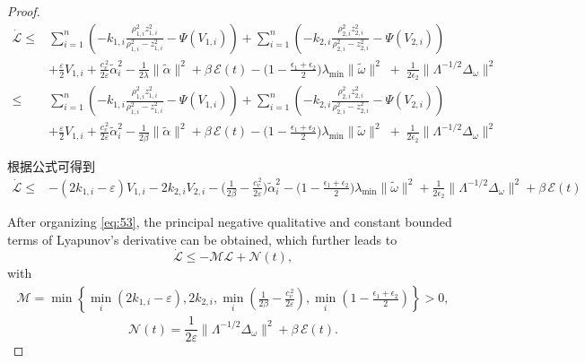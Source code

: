 \documentclass[pdflatex,sn-mathphys-num]{sn-jnl}%
\theoremstyle{thmstyleone}%
\theoremstyle{thmstyletwo}%
\theoremstyle{thmstylethree}%
\begin{document}
\begin{proof}
\begin{equation}\label{eq:45}
	\begin{aligned}
		\dot{\mathcal{L}} 
		\le&\sum_{i=1}^n \left( - k_{1,i}\frac{\rho_{1,i}^2 z_{1,i}^2}{\rho_{1,i}^2-z_{1,i}^2}-\Psi(V_{1,i})\right)
		+\sum_{i=1}^n \left( - k_{2,i}\frac{\rho_{2,i}^2 z_{2,i}^2}{\rho_{2,i}^2-z_{2,i}^2}-\Psi(V_{2,i})  \right)\\
		&+\frac{\varepsilon}{2} V_{1,i}+\frac{c_v^{\,2}}{2\varepsilon}\tilde\alpha_i^2-\frac{1}{2\lambda}\|\tilde\alpha\|^2+\beta\,\mathcal{E}(t)-\Big(1-\tfrac{\epsilon_1+\epsilon_2}{2}\Big)\lambda_{\min}\|\tilde\omega\|^2\;+\;\tfrac{1}{2\epsilon_2}\big\|\Lambda^{-1/2}\Delta_\omega\big\|^2\\
\le&\sum_{i=1}^n \left( - k_{1,i}\frac{\rho_{1,i}^2 z_{1,i}^2}{\rho_{1,i}^2-z_{1,i}^2}-\Psi(V_{1,i})\right)
		+\sum_{i=1}^n \left( - k_{2,i}\frac{\rho_{2,i}^2 z_{2,i}^2}{\rho_{2,i}^2-z_{2,i}^2}-\Psi(V_{2,i})  \right)\\
		&+\frac{\varepsilon}{2} V_{1,i}+\frac{c_v^{\,2}}{2\varepsilon}\tilde\alpha_i^2-\frac{1}{2\beta}\|\tilde\alpha\|^2+\beta\,\mathcal{E}(t)-\Big(1-\tfrac{\epsilon_1+\epsilon_2}{2}\Big)\lambda_{\min}\|\tilde\omega\|^2\;+\;\tfrac{1}{2\epsilon_2}\big\|\Lambda^{-1/2}\Delta_\omega\big\|^2
	\end{aligned}
\end{equation}

根据公式可得到
\begin{equation}\label{eq:45}
	\begin{aligned}
		\dot{\mathcal{L}} 
\le&-(2k_{1,i}-\varepsilon)V_{1,i}- 2k_{2,i}V_{2,i}-\Big(\frac{1}{2\beta}-\frac{c_v^{\,2}}{2\varepsilon}\Big)\tilde\alpha_i^2 -\Big(1-\tfrac{\epsilon_1+\epsilon_2}{2}\Big)\lambda_{\min}\|\tilde\omega\|^2
+\frac{1}{2\epsilon_2}\big\|\Lambda^{-1/2}\Delta_\omega\big\|^2
+\beta\,\mathcal{E}(t)
	\end{aligned}
\end{equation}






After organizing \cref{eq:53}, the principal negative qualitative and constant bounded terms of Lyapunov's derivative can be obtained, which further leads to
\begin{equation}\label{eq:54}
\dot{\mathcal{L}}\le -\mathcal{M}  \mathcal{L}+\mathcal{N}(t) ,
		\end{equation}
with
\begin{equation}\label{eq:55}
\begin{aligned}
\mathcal{M}  = \min \left\{
	\min_{i}\left(2k_{1,i}-\varepsilon\right), 2k_{2,i}, \min_{i}\left(\frac{1}{2\beta}-\frac{c_v^{\,2}}{2\varepsilon}\right),\min_{i}\left(1-\tfrac{\epsilon_1+\epsilon_2}{2}\right)
\right\}>0,
\end{aligned}
\end{equation}
\begin{equation}\label{eq:56}
	\mathcal{N}(t)  =\frac{1}{2\varepsilon}\big\|\Lambda^{-1/2}\Delta_\omega\big\|^2
+\beta\,\mathcal{E}(t).
\end{equation} 


\end{proof}
\end{document}
